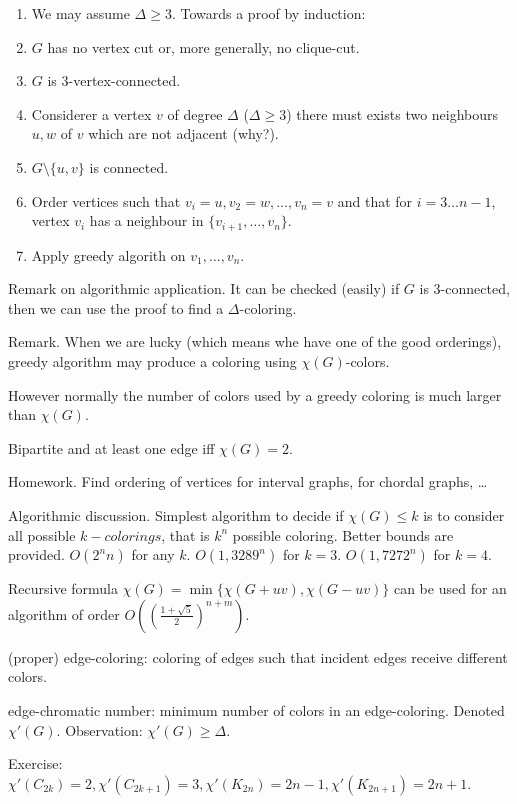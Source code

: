 \documentclass[12pt,a4paper]{article}
\begin{document}
\begin{enumerate}
\item We may assume \(\Delta \geq 3\). Towards a proof by induction:
\item \(G\) has no vertex cut or, more generally, no clique-cut.
\item \(G\) is 3-vertex-connected.
\item Considerer a vertex \(v\) of degree \(\Delta\) (\(\Delta \geq 3\)) there
must exists two neighbours \(u, w\) of \(v\) which are not adjacent (why?).
\item \(G \setminus \{u, v\}\) is connected.
\item Order vertices such that \(v_i=u, v_2=w, \dots, v_n=v\) and that for \(i=3
\dots n-1\), vertex \(v_i\) has a neighbour in \(\{v_{i+1}, \dots, v_n\}\).
\item Apply greedy algorith on \(v_1, \dots, v_n\).
\end{enumerate}

Remark on algorithmic application. It can be checked (easily) if \(G\) is
3-connected, then we can use the proof to find a \(\Delta\)-coloring.

Remark. When we are lucky (which means whe have one of the good orderings),
greedy algorithm may produce a coloring using \(\chi(G)\)-colors.

However normally the number of colors used by a greedy coloring is much larger
than \(\chi(G)\).

Bipartite and at least one edge iff \(\chi(G)=2\).

Homework. Find ordering of vertices for interval graphs, for chordal graphs, …

Algorithmic discussion.  Simplest algorithm to decide if \(\chi(G) \leq k\) is
to consider all possible \(k-colorings\), that is \(k^n\) possible
coloring. Better bounds are provided. \(O(2^n n)\) for any
\(k\). \(O(1,3289^n)\) for \(k=3\). \(O(1,7272^n)\) for \(k=4\).

Recursive formula \(\chi(G)=\min\{\chi(G+uv), \chi(G-uv)\}\) can be used for an
algorithm of order \(O\left({\left(\frac{1+\sqrt{5}}{2}\right)}^{n+m}\right)\).

(proper) edge-coloring: coloring of edges such that incident edges receive
different colors.

edge-chromatic number: minimum number of colors in an edge-coloring. Denoted
\(\chi'(G)\). Observation: \(\chi'(G) \geq \Delta\).

Exercise:
\(\chi'(C_{2k})=2, \chi'(C_{2k+1})=3, \chi'(K_{2n})=2n-1, \chi'(K_{2n+1})=2n+1\).
\end{document}
